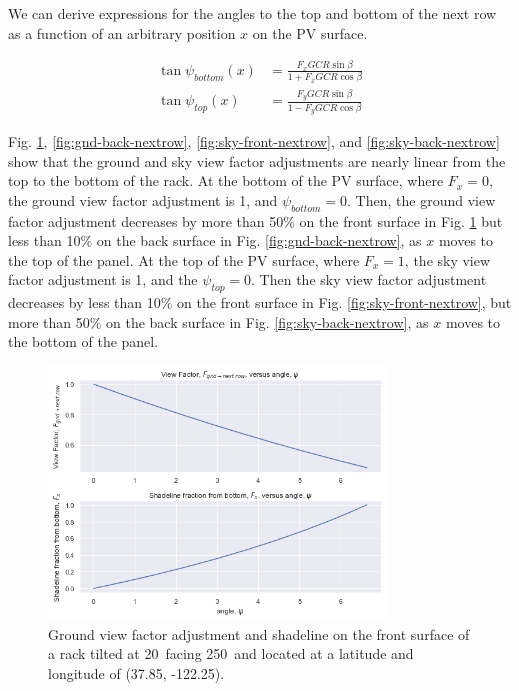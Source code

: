\documentclass[conference]{IEEEtran}
\begin{document}
We can derive expressions for the angles to the top and bottom of the next row as a function of an arbitrary position $x$ on the PV surface.

\begin{align}
\tan \psi_{bottom}\left(x \right) &= \frac{F_x GCR \sin \beta}{1 + F_x GCR \cos \beta}\\
\tan \psi_{top}\left(x \right) &= \frac{F_y GCR \sin \beta}{1 - F_y GCR \cos \beta}
\end{align}

Fig. \ref{fig:gnd-front-nextrow}, \ref{fig:gnd-back-nextrow}, \ref{fig:sky-front-nextrow}, and \ref{fig:sky-back-nextrow} show that the ground and sky view factor adjustments are nearly linear from the top to the bottom of the rack.  At the bottom of the PV surface, where $F_x=0$, the ground view factor adjustment is 1, and $\psi_{bottom}=0$.  Then, the ground view factor adjustment decreases by more than 50\% on the front surface in Fig. \ref{fig:gnd-front-nextrow} but less than 10\% on the back surface in Fig. \ref{fig:gnd-back-nextrow}, as $x$ moves to the top of the panel.  At the top of the PV surface, where $F_x=1$, the sky view factor adjustment is 1, and the $\psi_{top}=0$.  Then the sky view factor adjustment decreases by less than 10\% on the front surface in Fig. \ref{fig:sky-front-nextrow}, but more than 50\% on the back surface in Fig. \ref{fig:sky-back-nextrow}, as $x$ moves to the bottom of the panel.

\begin{figure}
\centering
\includegraphics[width=9cm]{ground_diffuse_front_w-next_row.png}
\caption{Ground view factor adjustment and shadeline on the front surface of a rack tilted at 20\degree\ facing 250\degree\ and located at a latitude and longitude of (37.85\degree, -122.25\degree).}
\label{fig:gnd-front-nextrow}
\end{figure}
\end{document}
